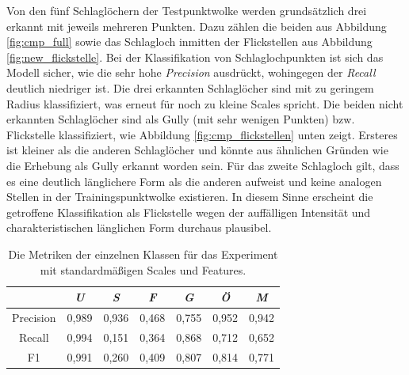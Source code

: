Von den fünf Schlaglöchern der Testpunktwolke werden grundsätzlich drei erkannt mit jeweils mehreren Punkten. Dazu zählen die beiden aus Abbildung \ref{fig:cmp_full} sowie das Schlagloch inmitten der Flickstellen aus Abbildung \ref{fig:new_flickstelle}. Bei der Klassifikation von Schlaglochpunkten ist sich das Modell sicher, wie die sehr hohe \textit{Precision} ausdrückt, wohingegen der \textit{Recall} deutlich niedriger ist. Die drei erkannten Schlaglöcher sind mit zu geringem Radius klassifiziert, was erneut für noch zu kleine Scales spricht. Die beiden nicht erkannten Schlaglöcher sind als Gully (mit sehr wenigen Punkten) bzw. Flickstelle klassifiziert, wie Abbildung \ref{fig:cmp_flickstellen} unten zeigt. Ersteres ist kleiner als die anderen Schlaglöcher und könnte aus ähnlichen Gründen wie die Erhebung als Gully erkannt worden sein. Für das zweite Schlagloch gilt, dass es eine deutlich länglichere Form als die anderen aufweist und keine analogen Stellen in der Trainingspunktwolke existieren. In diesem Sinne erscheint die getroffene Klassifikation als Flickstelle wegen der auffälligen Intensität und charakteristischen länglichen Form durchaus plausibel.

\begin{table}
\centering
\begin{tabular}{c|c|c|c|c|c|c}
 & \textit{U} & \textit{S} & \textit{F} & \textit{G} & \textit{Ö} & \textit{M} \\
\hline
Precision & 0,989 & 0,936 & 0,468 & 0,755 & 0,952 & 0,942 \\
Recall    & 0,994 & 0,151 & 0,364 & 0,868 & 0,712 & 0,652 \\
F1        & 0,991 & 0,260 & 0,409 & 0,807 & 0,814 & 0,771 \\
\end{tabular}
\caption{Die Metriken der einzelnen Klassen für das Experiment mit standardmäßigen Scales und Features.}
\label{table:default_metrics}
\end{table}

